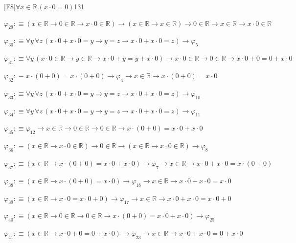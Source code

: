 \begin{fullproof}{[F8]}{$\forall x \in \mathbb{R}\,(x \cdot 0 = 0)$}{131}
\begin{abbrevlist}
\item $\varphi_{29} :\equiv (x \in \mathbb{R} \to 0 \in \mathbb{R} \to x \cdot 0 \in \mathbb{R}) \to (x \in \mathbb{R} \to x \in \mathbb{R}) \to 0 \in \mathbb{R} \to x \in \mathbb{R} \to x \cdot 0 \in \mathbb{R}$
\item $\varphi_{30} :\equiv \forall y\,\forall z\,(x \cdot 0 + x \cdot 0 = y \to y = z \to x \cdot 0 + x \cdot 0 = z) \to \varphi_{5}$
\item $\varphi_{31} :\equiv \forall y\,(x \cdot 0 \in \mathbb{R} \to y \in \mathbb{R} \to x \cdot 0 + y = y + x \cdot 0) \to x \cdot 0 \in \mathbb{R} \to 0 \in \mathbb{R} \to x \cdot 0 + 0 = 0 + x \cdot 0$
\item $\varphi_{32} :\equiv x \cdot (0 + 0) = x \cdot (0 + 0) \to \varphi_{4} \to x \in \mathbb{R} \to x \cdot (0 + 0) = x \cdot 0$
\item $\varphi_{33} :\equiv \forall y\,\forall z\,(x \cdot 0 + x \cdot 0 = y \to y = z \to x \cdot 0 + x \cdot 0 = z) \to \varphi_{10}$
\item $\varphi_{34} :\equiv \forall y\,\forall z\,(x \cdot 0 + x \cdot 0 = y \to y = z \to x \cdot 0 + x \cdot 0 = z) \to \varphi_{11}$
\item $\varphi_{35} :\equiv \varphi_{12} \to x \in \mathbb{R} \to 0 \in \mathbb{R} \to 0 \in \mathbb{R} \to x \cdot (0 + 0) = x \cdot 0 + x \cdot 0$
\item $\varphi_{36} :\equiv (x \in \mathbb{R} \to x \cdot 0 \in \mathbb{R}) \to 0 \in \mathbb{R} \to (x \in \mathbb{R} \to x \cdot 0 \in \mathbb{R}) \to \varphi_{8}$
\item $\varphi_{37} :\equiv (x \in \mathbb{R} \to x \cdot (0 + 0) = x \cdot 0 + x \cdot 0) \to \varphi_{7} \to x \in \mathbb{R} \to x \cdot 0 + x \cdot 0 = x \cdot (0 + 0)$
\item $\varphi_{38} :\equiv (x \in \mathbb{R} \to x \cdot (0 + 0) = x \cdot 0) \to \varphi_{18} \to x \in \mathbb{R} \to x \cdot 0 + x \cdot 0 = x \cdot 0$
\item $\varphi_{39} :\equiv (x \in \mathbb{R} \to x \cdot 0 = x \cdot 0 + 0) \to \varphi_{17} \to x \in \mathbb{R} \to x \cdot 0 + x \cdot 0 = x \cdot 0 + 0$
\item $\varphi_{40} :\equiv (x \in \mathbb{R} \to 0 \in \mathbb{R} \to 0 \in \mathbb{R} \to x \cdot (0 + 0) = x \cdot 0 + x \cdot 0) \to \varphi_{25}$
\item $\varphi_{41} :\equiv (x \in \mathbb{R} \to x \cdot 0 + 0 = 0 + x \cdot 0) \to \varphi_{23} \to x \in \mathbb{R} \to x \cdot 0 + x \cdot 0 = 0 + x \cdot 0$
\end{abbrevlist}
\end{fullproof}
